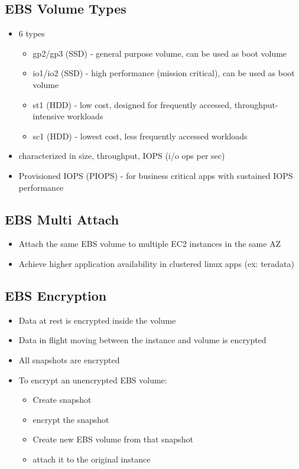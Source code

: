 \documentclass[]{scrartcl}
\begin{document}
\subsection{EBS Volume Types}
\begin{itemize}
	\item 6 types
	\begin{itemize}
		\item gp2/gp3 (SSD) - general purpose volume, can be used as boot volume
		\item io1/io2 (SSD) - high performance (mission critical), can be used as boot volume
		\item st1 (HDD) - low cost, designed for frequently accessed, throughput-intensive workloads
		\item sc1 (HDD) - lowest cost, less frequently accessed workloads
	\end{itemize}
	\item characterized in size, throughput, IOPS (i/o ops per sec)
	\item Provisioned IOPS (PIOPS) - for business critical apps with sustained IOPS performance
\end{itemize}

\subsection{EBS Multi Attach}
\begin{itemize}
	\item Attach the same EBS volume to multiple EC2 instances in the same AZ
	\item Achieve higher application availability in clustered linux apps (ex: teradata)
\end{itemize}

\subsection{EBS Encryption}
\begin{itemize}
	\item Data at rest is encrypted inside the volume
	\item Data in flight moving between the instance and volume is encrypted
	\item All snapshots are encrypted
	\item To encrypt an unencrypted EBS volume:
	\begin{itemize}
		\item Create snapshot
		\item encrypt the snapshot
		\item Create new EBS volume from that snapshot
		\item attach it to the original instance
	\end{itemize}
\end{itemize}
\end{document}
